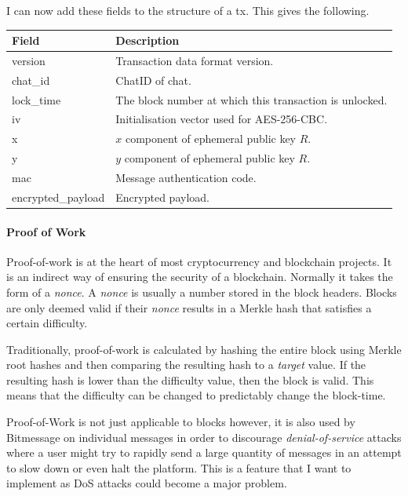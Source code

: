 \documentclass{article}
\begin{document}
I can now add these fields to the structure of a tx. This gives the following.
\begin{table}[H]
\centering
\begin{tabular}{|p{3cm}|p{8.5cm}|}
\hline
\rowcolor{tblgrey}
Field       & Description\\ \hline
version     & Transaction data format version.                          \\ \hline
chat\_id    & ChatID of chat.   \\ \hline
lock\_time  & The block number at which this transaction is unlocked. \\ \hline
iv          & Initialisation vector used for AES-256-CBC.   \\ \hline
x           & $x$ component of ephemeral public key $R$.    \\ \hline
y           & $y$ component of ephemeral public key $R$.    \\ \hline
mac         & Message authentication code.                  \\ \hline
encrypted\_payload & Encrypted payload.                     \\ \hline
\end{tabular}
\end{table}


\paragraph{Proof of Work}
Proof-of-work is at the heart of most cryptocurrency and blockchain projects. It is an indirect way of ensuring the security of a blockchain. Normally it takes the form of a \textit{nonce}. A \textit{nonce} is usually a number stored in the block headers. Blocks are only deemed valid if their \textit{nonce} results in a Merkle hash that satisfies a certain difficulty.

Traditionally, proof-of-work is calculated by hashing the entire block using Merkle root hashes and then comparing the resulting hash to a \textit{target} value. If the resulting hash is lower than the difficulty value, then the block is valid. This means that the difficulty can be changed to predictably change the block-time.

Proof-of-Work is not just applicable to blocks however, it is also used by Bitmessage on individual messages in order to discourage \textit{denial-of-service}\cite{bitmessage_pow} attacks where a user might try to rapidly send a large quantity of messages in an attempt to slow down or even halt the platform. This is a feature that I want to implement as DoS attacks could become a major problem.
\end{document}
